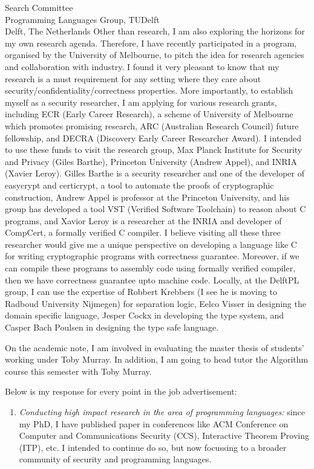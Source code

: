 \documentclass{letter}
\begin{document}
\begin{letter}{Search Committee\\
Programming Languages Group, TUDelft\\
Delft, The Netherlands}
Other than research, I am also exploring the horizons for my own research agenda.  
Therefore, I have recently participated in a program, organised by the University of Melbourne, 
to pitch the idea for research agencies and  collaboration with industry. I found it 
very pleasant to know that my research is  a must requirement  
for any setting where they care about security/confidentiality/correctness properties. 
More importantly,  to establish myself 
as a security researcher,  I am applying for 
various research grants, including ECR (Early Career Research), 
a scheme of University of Melbourne which promotes promising research, 
ARC (Australian Research Council) future fellowship, and 
DECRA (Discovery Early Career Researcher Award). 
I intended to use these funds to visit the research group, 
Max Planck Institute for Security and Privacy (Giles Barthe),
Princeton University (Andrew Appel), and INRIA (Xavier Leroy). 
Gilles Barthe is a security researcher and one of the developer of 
easycrypt and certicrypt, a tool to automate the proofs of 
cryptographic construction, Andrew Appel is professor at the 
Princeton University, and his group has developed a tool VST
(Verified Software Toolchain) to reason about C programs, and 
Xavior Leroy is a researcher at the INRIA and developer of 
CompCert, a formally verified C compiler. I believe visiting all 
these three researcher would give me a unique perspective 
on developing a language like C for writing cryptographic programs
with correctness guarantee.  Moreover, if we can compile these 
programs to assembly code  using formally verified compiler, then 
we have correctness guarantee upto machine code.  Locally, 
at the DelftPL group, I can use the expertise of Robbert Krebbers 
(I see he is moving to Radboud University Nijmegen) 
for separation logic, Eelco Visser in designing the  domain specific 
language, Jesper Cockx in developing the type system, 
and  Casper Bach Poulsen in designing the type safe language.




On the academic note, I am involved in evaluating the master thesis of 
students' working under Toby Murray. In addition, I am going to head tutor the 
Algorithm course this semester with Toby Murray. 

 
Below is my response for every point in the job advertisement: 
\begin{enumerate}
\item \textit{Conducting high impact research in the area of programming languages:}
	since my PhD, I have published paper in  conferences like ACM Conference on Computer and Communications Security (CCS), 
	Interactive Theorem Proving (ITP),  etc. I intended to continue do so, but now focussing to a broader community of 
	 security and programming languages. 
	

\end{enumerate}
\end{letter}
\end{document}
